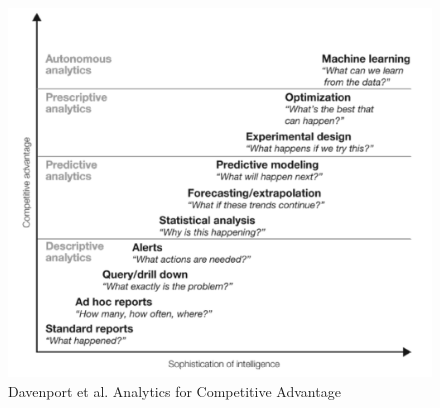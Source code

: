 \begin{figure}
    \centering
    \includegraphics[width=14cm]{images/hbr/davenport-et-al-competing-on-analytics-2017-competitive-advantage.png}
    \caption{Davenport et al. Analytics for Competitive Advantage}
    \label{fig:davenport-analytics-for-competitive-advantage}
\end{figure}


